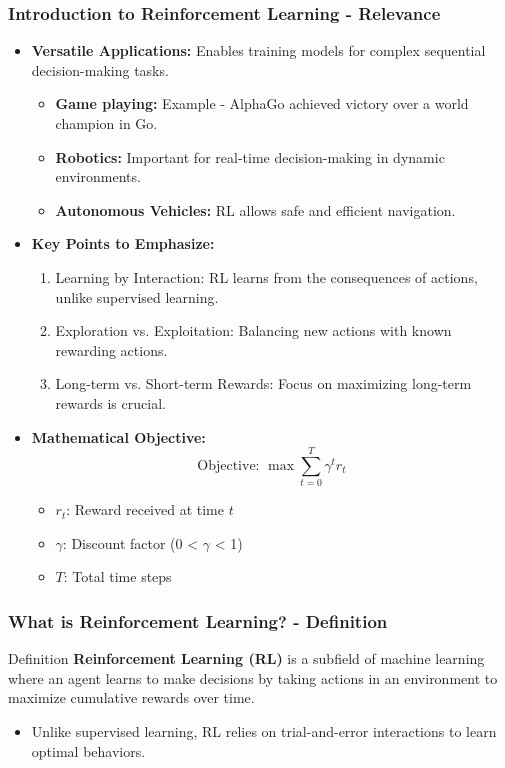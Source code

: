 \documentclass[aspectratio=169]{beamer}
\begin{document}
\begin{frame}[fragile]
    \frametitle{Introduction to Reinforcement Learning - Relevance}
    \begin{itemize}
        \item \textbf{Versatile Applications:} Enables training models for complex sequential decision-making tasks.
        \begin{itemize}
            \item \textbf{Game playing:} Example - AlphaGo achieved victory over a world champion in Go.
            \item \textbf{Robotics:} Important for real-time decision-making in dynamic environments.
            \item \textbf{Autonomous Vehicles:} RL allows safe and efficient navigation.
        \end{itemize}

        \item \textbf{Key Points to Emphasize:}
        \begin{enumerate}
            \item Learning by Interaction: RL learns from the consequences of actions, unlike supervised learning.
            \item Exploration vs. Exploitation: Balancing new actions with known rewarding actions.
            \item Long-term vs. Short-term Rewards: Focus on maximizing long-term rewards is crucial.
        \end{enumerate}

        \item \textbf{Mathematical Objective:}
        \begin{equation}
            \text{Objective: } \max \sum_{t=0}^{T} \gamma^t r_t
        \end{equation}
        \begin{itemize}
            \item \( r_t \): Reward received at time \( t \)
            \item \( \gamma \): Discount factor (0 < \( \gamma \) < 1)
            \item \( T \): Total time steps
        \end{itemize}
    \end{itemize}
\end{frame}

\begin{frame}[fragile]
    \frametitle{What is Reinforcement Learning? - Definition}
    \begin{block}{Definition}
        \textbf{Reinforcement Learning (RL)} is a subfield of machine learning where an agent learns to make decisions by taking actions in an environment to maximize cumulative rewards over time.
    \end{block}
    \begin{itemize}
        \item Unlike supervised learning, RL relies on trial-and-error interactions to learn optimal behaviors.
    \end{itemize}
\end{frame}
\end{document}
